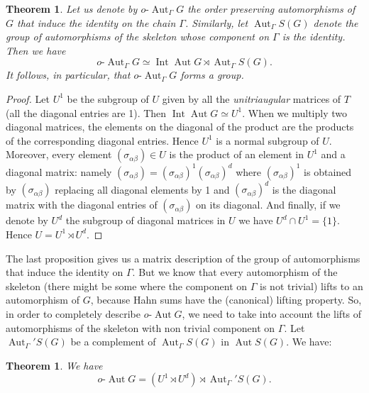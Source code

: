 \documentclass[12pt,a4paper,reqno,openright]{amsart}
\renewcommand{\1}{\mathbbm{1}}
\DeclareMathOperator{\id}{id}
\DeclareMathOperator{\Aut}{Aut}
\DeclareMathOperator{\Int}{Int}
\newcommand{\oAut}{o\text{-}\Aut}
\theoremstyle{definition}
\theoremstyle{plain}
\theoremstyle{plain}
\theoremstyle{plain}
\theoremstyle{plain}
\theoremstyle{plain}
\newtheorem{theorem}[defn]{Theorem}
\theoremstyle{plain}
\theoremstyle{plain}
\theoremstyle{plain}
\theoremstyle{definition}
\theoremstyle{definition}
\theoremstyle{plain}
\theoremstyle{definition}
\theoremstyle{definition}
\theoremstyle{plain}
\theoremstyle{plain}
\theoremstyle{plain}
\begin{document}
\begin{theorem}\label{prop:oAutGamma-G-direct product}
	Let us denote by $ \oAut_\Gamma G $ the order preserving automorphisms of $ G $ that induce the identity on the chain $ \Gamma $. 
	Similarly, let $ \Aut_\Gamma S(G) $ denote the group of automorphisms of the skeleton whose component on $ \Gamma $ is the identity.
	Then we have
	\[
	\oAut_\Gamma G \simeq \Int\Aut G \rtimes \Aut_\Gamma S(G).
	\]
	It follows, in particular, that $ \oAut_\Gamma G $ forms a group.
\end{theorem}
\begin{proof}
	Let $ U^1 $ be the subgroup of $ U $ given by all the \emph{unitriaugular} matrices of $ T $ (all the diagonal entries are 1). Then $ \Int\Aut G \simeq U^1 $. When we multiply two diagonal matrices, the elements on the diagonal of the product are the products of the corresponding diagonal entries. Hence $ U^1 $ is a normal subgroup of $ U $. Moreover, every element $ (\sigma_{\alpha\beta})\in U $ is the product of an element in $ U^1 $ and a diagonal matrix: namely $ (\sigma_{\alpha\beta})=(\sigma_{\alpha\beta})^1(\sigma_{\alpha\beta})^d $ where $ (\sigma_{\alpha\beta})^1 $ is obtained by $ (\sigma_{\alpha\beta}) $ replacing all diagonal elements by 1 and $ (\sigma_{\alpha\beta})^d $ is the diagonal matrix with the diagonal entries of $ (\sigma_{\alpha\beta}) $ on its diagonal. And finally, if we denote by $ U^d $ the subgroup of diagonal matrices in $ U $ we have $ U^d\cap U^1=\{ 1 \} $. Hence $ U = U^1\rtimes U^d $.
\end{proof}
The last proposition gives us a matrix description of the group of automorphisms that induce the identity on $ \Gamma $. 
But we know that every automorphism of the skeleton (there might be some where the component on $ \Gamma $ is not trivial) lifts to an automorphism of $ G $, because Hahn sums have the (canonical) lifting property. So, in order to completely describe $ \oAut G $, we need to take into account the lifts of automorphisms of the skeleton with non trivial component on $ \Gamma $. Let $ \Aut_\Gamma'S(G)  $ be a complement of $ \Aut_\Gamma S(G) $ in $\Aut S(G) $. 
We have:
\begin{theorem}\label{thm:DG-semidirect-enhanced}
	We have
	\[
	\oAut G = \left( U^1 \rtimes U^d \right)
	\rtimes \Aut_\Gamma'S(G).
	\]
\end{theorem}
\end{document}
